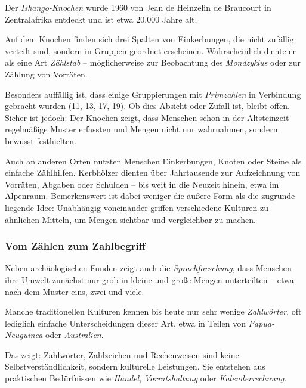 \begin{HistoryBox}
	Der \emph{Ishango-Knochen} wurde 1960 von
	Jean de Heinzelin de Braucourt in Zentralafrika entdeckt und ist etwa 20.000 Jahre alt.
	
	Auf dem Knochen finden sich drei Spalten von Einkerbungen,
	die nicht zufällig verteilt sind, sondern in Gruppen geordnet erscheinen.
	Wahrscheinlich diente er als eine Art \emph{Zählstab} --
	möglicherweise zur Beobachtung des \emph{Mondzyklus}
	oder zur Zählung von Vorräten.
	
	Besonders auffällig ist, dass einige Gruppierungen mit
	\emph{Primzahlen} in Verbindung gebracht wurden
	(11, 13, 17, 19).
	Ob dies Absicht oder Zufall ist, bleibt offen.
	Sicher ist jedoch:
	Der Knochen zeigt, dass Menschen schon in der Altsteinzeit
	regelmäßige Muster erfassten und Mengen nicht nur wahrnahmen,
	sondern bewusst festhielten.
	\label{box:ishango}
\end{HistoryBox}

Auch an anderen Orten nutzten Menschen Einkerbungen, Knoten oder Steine als einfache Zählhilfen.
Kerbhölzer dienten über Jahrtausende zur Aufzeichnung von Vorräten, Abgaben oder Schulden --
bis weit in die Neuzeit hinein, etwa im Alpenraum.
Bemerkenswert ist dabei weniger die äußere Form als die zugrunde liegende Idee:
Unabhängig voneinander griffen verschiedene Kulturen zu ähnlichen Mitteln,
um Mengen sichtbar und vergleichbar zu machen.

\subsubsection*{Vom Zählen zum Zahlbegriff}
Neben archäologischen Funden zeigt auch die \emph{Sprachforschung},
dass Menschen ihre Umwelt zunächst nur grob in kleine und große Mengen unterteilten --
etwa nach dem Muster \glqq eins\grqq, \glqq zwei\grqq{} und \glqq viele\grqq.

Manche traditionellen Kulturen kennen bis heute nur sehr wenige
\emph{Zahlwörter},
oft lediglich einfache Unterscheidungen dieser Art,
etwa in Teilen von \emph{Papua-Neuguinea}
oder \emph{Australien}.

Das zeigt:
Zahlwörter, Zahlzeichen und Rechenweisen sind keine Selbstverständlichkeit,
sondern kulturelle Leistungen.
Sie entstehen aus praktischen Bedürfnissen wie
\emph{Handel},
\emph{Vorratshaltung}
oder \emph{Kalenderrechnung}.


